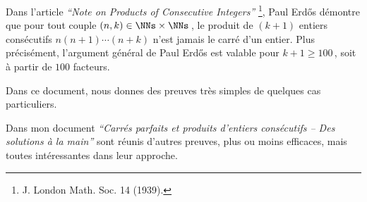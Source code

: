 Dans l'article \emph{\enquote{Note on Products of Consecutive Integers}}
\footnote{
	J. London Math. Soc. 14 (1939).
},
Paul Erdős démontre que pour tout couple $(n, k) \in \NNs \times \NNs$\,, le produit de $(k+1)$ entiers consécutifs $n (n + 1) \cdots (n + k)$ n'est jamais le carré d'un entier. 
Plus précisément, l'argument général de Paul Erdős est valable pour $k + 1 \geq 100$\,, soit à partir de $100$ facteurs.

\medskip

Dans ce document, nous donnes des preuves très simples de quelques cas particuliers.


\begin{remark}
	Dans mon document \emph{\enquote{Carrés parfaits et produits d'entiers consécutifs -- Des solutions à la main}} sont réunis d'autres preuves, plus ou moins efficaces, mais toutes intéressantes dans leur approche.
\end{remark}

